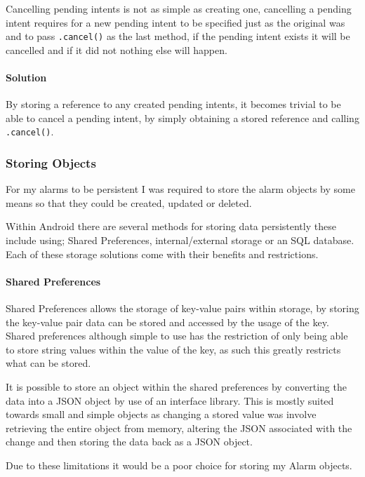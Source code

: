 Cancelling pending intents is not as simple as creating one, cancelling
a pending intent requires for a new pending intent to be specified just
as the original was and to pass \lstinline!.cancel()! as the last
method, if the pending intent exists it will be cancelled and if it did
not nothing else will happen.

\paragraph{Solution}\label{solution-2}

By storing a reference to any created pending intents, it becomes
trivial to be able to cancel a pending intent, by simply obtaining a
stored reference and calling \lstinline!.cancel()!.

\subsubsection{Storing Objects}\label{storing-objects}

For my alarms to be persistent I was required to store the alarm objects
by some means so that they could be created, updated or deleted.

Within Android there are several methods for storing data persistently
these include using; Shared Preferences, internal/external storage or an
SQL database. Each of these storage solutions come with their benefits
and restrictions.

\paragraph{Shared Preferences}\label{shared-preferences}

Shared Preferences allows the storage of key-value pairs within storage,
by storing the key-value pair data can be stored and accessed by the
usage of the key. Shared preferences although simple to use has the
restriction of only being able to store string values within the value
of the key, as such this greatly restricts what can be stored.

It is possible to store an object within the shared preferences by
converting the data into a JSON object by use of an interface library.
This is mostly suited towards small and simple objects as changing a
stored value was involve retrieving the entire object from memory,
altering the JSON associated with the change and then storing the data
back as a JSON object.

Due to these limitations it would be a poor choice for storing my Alarm
objects.

